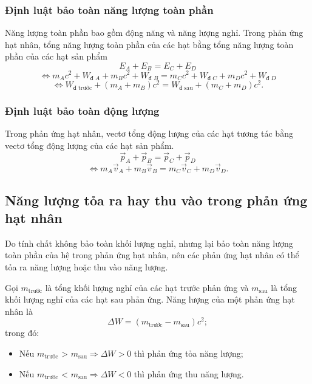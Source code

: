 	\subsubsection{Định luật bảo toàn năng lượng toàn phần}
	Năng lượng toàn phần bao gồm động năng và năng lượng nghỉ. Trong phản ứng hạt nhân, tổng năng lượng toàn phần của các hạt bằng tổng năng lượng toàn phần của các hạt sản phẩm
	\begin{equation}
	E_A+E_B=E_C+E_D
	\end{equation}
	\begin{equation}
	\Leftrightarrow m_Ac^2+ W_{\textrm{đ }A} + m_Bc^2+W_{\textrm{đ }B} = m_Cc^2+ W_{\textrm{đ }C} + m_Dc^2+W_{\textrm{đ }D}
	\end{equation}
	\begin{equation}
	\Leftrightarrow W_\textrm{đ trước} + (m_A+m_B)c^2 = W_\textrm{đ sau} + (m_C+m_D)c^2 .
	\end{equation}
	
	\subsubsection{Định luật bảo toàn động lượng}
	Trong phản ứng hạt nhân, vectơ tổng động lượng của các hạt tương tác bằng vectơ tổng động lượng của các hạt sản phẩm.
	\begin{equation}
	\vec{p}_A + \vec{p}_B = \vec{p}_C + \vec{p}_D
	\end{equation}
	\begin{equation}
	\Leftrightarrow m_A\vec{v}_A + m_B\vec{v}_B = m_C\vec{v}_C + m_D\vec{v}_D.
	\end{equation}

\subsection{Năng lượng tỏa ra hay thu vào trong phản ứng hạt nhân}
	Do tính chất không bảo toàn khối lượng nghỉ, nhưng lại bảo toàn năng lượng toàn phần của hệ trong phản ứng hạt nhân, nên các phản ứng hạt nhân có thể tỏa ra năng lượng hoặc thu vào năng lượng. 
	
	Gọi $m_\text{trước}$ là tổng khối lượng nghỉ của các hạt trước phản ứng và $m_\text{sau}$ là tổng khối lượng nghỉ của các hạt sau phản ứng. Năng lượng của một phản ứng hạt nhân là
	\begin{equation}
	\Delta W = \left(m_\text{trước} - m_\text{sau}\right) c^2;
	\end{equation}
	trong đó:
	\begin{itemize}
		\item Nếu $m_\text{trước}$ > $m_\text{sau} \Rightarrow \Delta W >0$ thì phản ứng tỏa năng lượng;
		\item Nếu $m_\text{trước}$ < $m_\text{sau} \Rightarrow \Delta W < 0$ thì phản ứng thu năng lượng.
	\end{itemize}
	
